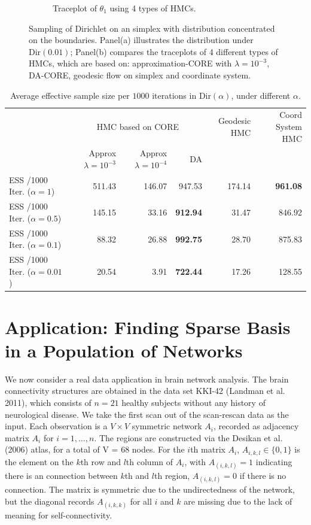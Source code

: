 \documentclass[10pt,fleqn]{article}
\DeclareMathOperator{\1}{\mathbbm{1}}
\begin{document}
\begin{figure}[H]
\begin{subfigure}[b]{0.45\textwidth}
\caption{Traceplot of $\theta_1$ using 4 types of HMCs.}
\end{subfigure}
\caption{Sampling of Dirichlet on an simplex with distribution concentrated on the boundaries.
Panel(a) illustrates the distribution under $\text{Dir}(0.01)$; Panel(b)
compares the traceplots of 4 different types of HMCs, which are based on: approximation-CORE with $\lambda=10^{-3}$, DA-CORE, geodesic flow on simplex \citep{byrne2013geodesic} and coordinate
system.}
\label{simplex}
\end{figure}


   \begin{table}[H]
     
   \begin{center}
   \tiny
   \begin{tabular}{ l| r | r| r |r | r}
   \hline     
    & \multicolumn{3}{c|}{HMC based on CORE}     & Geodesic HMC  & Coord
    System HMC \\   
        & {Approx $\lambda=10^{-3}$} & {Approx $\lambda=10^{-4}$}      & DA
        &  \\  \hline         
   ESS /1000 Iter. ($\alpha=1$) & 511.43   & 146.07  & 947.53 &  174.14
   & \bf 961.08     \\
      ESS /1000 Iter. ($\alpha=0.5$) & 145.15  & 33.16  &\bf  912.94  & 31.47  & 846.92   \\
            ESS /1000 Iter. ($\alpha=0.1$) &  88.32   & 26.88& \bf 992.75  &28.70  & 875.83    \\
   ESS /1000 Iter. ($\alpha=0.01$) & 20.54 & 3.91 & {\bf 722.44} & 17.26  & 128.55  \\
   \hline  
   \end{tabular}
   \end{center}
   \caption{Average effective sample size per $1000$ iterations in $\text{Dir}(\alpha)$,
   under different $\alpha$. \label{simplex_tb}
}
   \end{table}

   \section{Application: Finding Sparse Basis in a Population of Networks}

 We now consider a real data application in brain network analysis. 
 The brain connectivity structures are obtained in the data set KKI-42 (Landman et al. 2011), which consists of $n=21$ healthy subjects without any history of neurological disease. We take the first scan out of the scan-rescan data
as the input. Each observation is a $V\times V$ symmetric network $A_i$, recorded as adjacency matrix $A_i$ for $i=1,\ldots,n$. The regions are constructed via the Desikan et al. (2006) atlas, for a total of V = 68 nodes.
For the $i$th matrix $A_i$, $A_{i,k,l} \in \{0,1\}$ is the element on the $k$th row and $l$th column of $A_i$, with $A_{(i,k,l)}=1$ indicating there is an connection between $k$th and $l$th region, $A_{(i,k,l)}=0$ if there is no connection. The matrix is symmetric due to the undirectedness of the network,
but the diagonal records $A_{(i,k,k)}$ for all $i$ and $k$ are missing due
to the lack of meaning for self-connectivity. 
\end{document}
